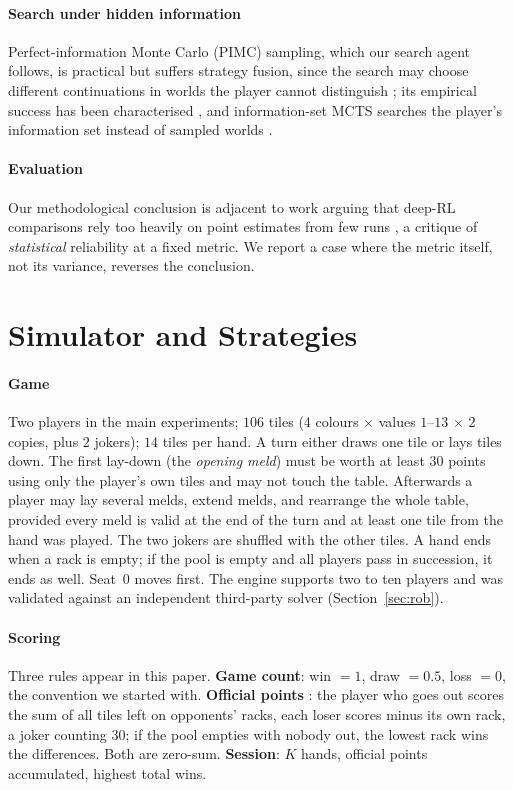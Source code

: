 \documentclass[10pt,journal,compsoc]{IEEEtran}
\begin{document}
\paragraph*{Search under hidden information}
Perfect-information Monte Carlo (PIMC) sampling, which our search agent follows, is practical but suffers strategy fusion, since the search may choose different continuations in worlds the player cannot distinguish \cite{frank1998}; its empirical success has been characterised \cite{long2010}, and information-set MCTS searches the player's information set instead of sampled worlds \cite{cowling2012}.

\paragraph*{Evaluation}
Our methodological conclusion is adjacent to work arguing that deep-RL comparisons rely too heavily on point estimates from few runs \cite{agarwal2021}, a critique of \emph{statistical} reliability at a fixed metric. We report a case where the metric itself, not its variance, reverses the conclusion.

\section{Simulator and Strategies}
\paragraph*{Game}
Two players in the main experiments; $106$ tiles ($4$ colours $\times$ values $1$--$13$ $\times$ $2$ copies, plus $2$ jokers); $14$ tiles per hand. A turn either draws one tile or lays tiles down. The first lay-down (the \emph{opening meld}) must be worth at least $30$ points using only the player's own tiles and may not touch the table. Afterwards a player may lay several melds, extend melds, and rearrange the whole table, provided every meld is valid at the end of the turn and at least one tile from the hand was played. The two jokers are shuffled with the other tiles. A hand ends when a rack is empty; if the pool is empty and all players pass in succession, it ends as well. Seat~0 moves first. The engine supports two to ten players and was validated against an independent third-party solver (Section~\ref{sec:rob}).

\paragraph*{Scoring}
Three rules appear in this paper. \textbf{Game count}: win $=1$, draw $=0.5$, loss $=0$, the convention we started with. \textbf{Official points} \cite{pagat2024}: the player who goes out scores the sum of all tiles left on opponents' racks, each loser scores minus its own rack, a joker counting $30$; if the pool empties with nobody out, the lowest rack wins the differences. Both are zero-sum. \textbf{Session}: $K$ hands, official points accumulated, highest total wins.
\end{document}
